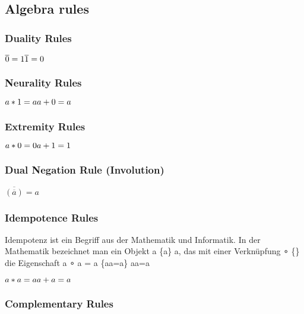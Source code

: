 \documentclass[11pt]{article}
\begin{document}
    \subsection{Algebra rules}\label{algebra-rules}

    \subsubsection{Duality Rules}\label{duality-rules}

\(\overline{0} = 1 \\  \overline{1} = 0\)

\subsubsection{Neurality Rules}\label{neurality-rules}

\(a*1 = a \\  a+0 = a\)

\subsubsection{Extremity Rules}\label{extremity-rules}

\(a*0 = 0 \\  a+1 = 1\)

\subsubsection{Dual Negation Rule
(Involution)}\label{dual-negation-rule-involution}

\(\overline{(\overline{a})} = a\)

\subsubsection{Idempotence Rules}\label{idempotence-rules}

Idempotenz ist ein Begriff aus der Mathematik und Informatik. In der
Mathematik bezeichnet man ein Objekt a \{\displaystyle a\} a, das mit
einer Verknüpfung ∘ \{\displaystyle \circ \} \circ die Eigenschaft a ∘ a
= a \{\displaystyle a\circ a=a\} a\circ a=a

\(a*a = a \\  a+a = a\)

\subsubsection{Complementary Rules}\label{complementary-rules}
\end{document}

